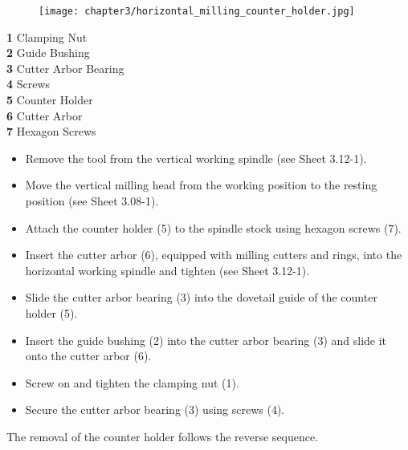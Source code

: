 
\begin{figure}[h]
    \centering
    \texttt{[image: chapter3/horizontal\_milling\_counter\_holder.jpg]}
    \label{fig:horizontal_milling_counter_holder}
\end{figure}

\textbf{1} \quad Clamping Nut \\
\textbf{2} \quad Guide Bushing \\
\textbf{3} \quad Cutter Arbor Bearing \\
\textbf{4} \quad Screws \\
\textbf{5} \quad Counter Holder \\
\textbf{6} \quad Cutter Arbor \\
\textbf{7} \quad Hexagon Screws

\vspace{0.3cm}

\begin{itemize}
    \item Remove the tool from the vertical working spindle (see Sheet 3.12-1).
    \item Move the vertical milling head from the working position to the resting position (see Sheet 3.08-1).
    \item Attach the counter holder (5) to the spindle stock using hexagon screws (7).
    \item Insert the cutter arbor (6), equipped with milling cutters and rings, into the horizontal working spindle and tighten (see Sheet 3.12-1).
\end{itemize}


\begin{itemize}
    \item Slide the cutter arbor bearing (3) into the dovetail guide of the counter holder (5).
    \item Insert the guide bushing (2) into the cutter arbor bearing (3) and slide it onto the cutter arbor (6).
    \item Screw on and tighten the clamping nut (1).
    \item Secure the cutter arbor bearing (3) using screws (4).
\end{itemize}

The removal of the counter holder follows the reverse sequence.\footnotemark

